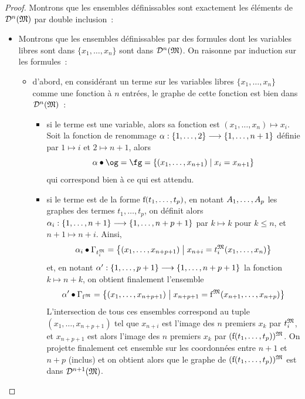 \begin{proof}
  Montrons que les ensembles définissables sont exactement les éléments de
  $\mathcal{D}^n(\mathfrak{M})$ par double inclusion~:
  \begin{itemize}
  \item[\fbox{$\subseteq$}] Montrons que les ensembles définissables par
    des formules dont les variables libres sont dans $\{x_1,\ldots,x_n\}$ sont
    dans $\mathcal{D}^n(\mathfrak{M})$. On raisonne par induction sur les formules~:
    \begin{itemize}
    \item d'abord, en considérant un terme sur les variables libres
      $\{x_1,\ldots,x_n\}$ comme une fonction à $n$ entrées, le graphe de cette
      fonction est bien dans $\mathcal{D}^n(\mathfrak{M})$~:
      \begin{itemize}
      \item si le terme est une variable, alors sa fonction est
        $(x_1,\ldots,x_n)\mapsto x_i$. Soit la fonction de
        renommage $\alpha : \displaystyle \{1,\ldots,2\} \longrightarrow \{1,\ldots,n+1\}$
        définie par $1\mapsto i$ et $2\mapsto n+1$, alors
        \[\varRen\actRen\ogM=\fgM =
        \compr{(x_1,\ldots,x_{n+1})}{x_i = x_{n+1}}\]
        qui correspond bien à ce qui est attendu.
      \item si le terme est de la forme $\mathrm{f}(t_1,\ldots,t_p)$, en notant
        $A_1,\ldots,A_p$ les graphes des termes $t_1,\ldots,t_p$, on
        définit alors
        $\alpha_i : \displaystyle \{1,\ldots,n+1\} \longrightarrow \{1,\ldots,n+p+1\}$
        par $k \mapsto k$ pour $k \leq n$, et $n+1\mapsto n+i$. Ainsi,
        \[\alpha_i\mathbin{\bullet}\Gamma_{t_i^{\mathfrak{M}}} =
        \left\{ (x_1,\ldots,x_{n+p+1}) \;\middle\vert\; x_{n+i} = t_i^{\mathfrak{M}}(x_1,\ldots,x_n) \right\}\]
        et, en notant
        $\alpha' : \displaystyle \{1,\ldots,p+1\} \longrightarrow \{1,\ldots,n+p+1\}$
        la fonction $k \mapsto n + k$, on obtient finalement l'ensemble
        \[\alpha'\mathbin{\bullet}\Gamma_{\mathrm{f}^{\mathfrak{M}}} =
        \left\{ (x_1,\ldots,x_{n+p+1}) \;\middle\vert\; x_{n+p+1} = \mathrm{f}^{\mathfrak{M}}(x_{n+1},\ldots,x_{n+p}) \right\}\]
        L'intersection de tous ces ensembles correspond au tuple
        $(x_1,\ldots,x_{n+p+1})$ tel que $x_{n+i}$ est l'image des
        $n$ premiers $x_k$ par $t_i^{\mathfrak{M}}$, et $x_{n+p+1}$ est alors
        l'image des $n$ premiers $x_k$ par $(\mathrm{f}(t_1,\ldots,t_p))^{\mathfrak{M}}$.
        On projette finalement cet ensemble sur les coordonnées entre
        $n+1$ et $n+p$ (inclus) et on obtient alors que le graphe de
        $(\mathrm{f}(t_1,\ldots,t_p))^{\mathfrak{M}}$ est dans $\mathcal{D}^{n+1}(\mathfrak{M})$.

\end{itemize}
\end{itemize}
\end{itemize}
\end{proof}
